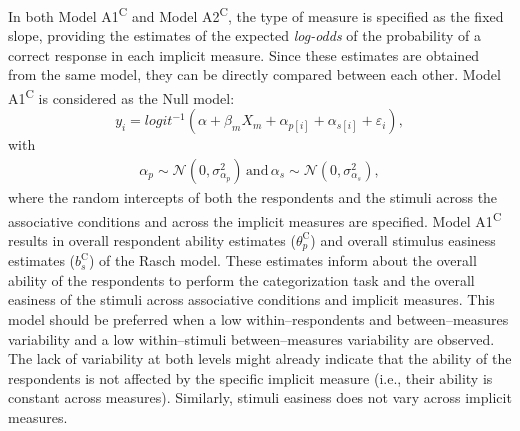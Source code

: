 \documentclass[12pt]{book}
\begin{document}
In both Model A1\textsuperscript{C} and Model A2\textsuperscript{C}, the type of measure is specified as the fixed slope, providing the estimates of the expected \emph{log-odds} of the probability of a correct response in each implicit measure. Since these estimates are obtained from the same model, they can be directly compared between each other.
Model A1\textsuperscript{C} is considered as the Null model: 
%
\begin{equation}\label{eq:typeNull}
	y_{i} = logit^{-1}(\alpha + \beta_mX_m + \alpha_{p[i]} +  \alpha_{s[i]} + \varepsilon_{i}),
\end{equation}
with
\begin{align}
	\alpha_{p} \sim  \mathcal{N} ( 0, \sigma_{\alpha_p}^2) \, \text{and}  \,	\alpha_{s}  \sim  \mathcal{N} (0,\sigma_{\alpha_s}^2),
\end{align}
where the random intercepts of both the respondents and the stimuli across the associative conditions and across the implicit measures are specified.
Model A1\textsuperscript{C} results in overall respondent ability estimates ($\theta_{p}^\text{C}$) and overall stimulus easiness estimates ($b_{s}^\text{C}$) of the Rasch model. 
These estimates inform about the overall ability of the respondents to perform the categorization task and the overall easiness of the stimuli across associative conditions and implicit measures. This model should be preferred when  a low within--respondents and between--measures variability and a low within--stimuli between--measures variability are observed. 
The lack of variability at both levels might already indicate that the ability of the respondents is not affected by the specific implicit measure (i.e., their ability is constant across measures).
Similarly, stimuli easiness does not vary across implicit measures.
\end{document}

